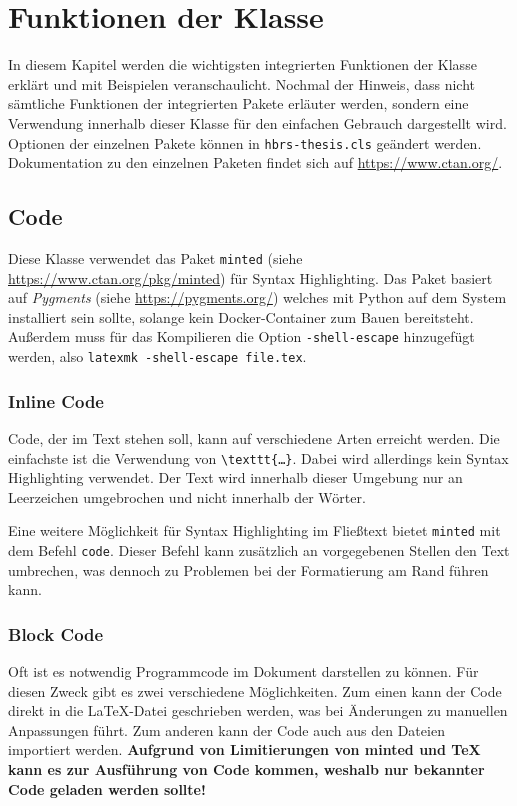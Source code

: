 \chapter{Funktionen der Klasse}
In diesem Kapitel werden die wichtigsten integrierten Funktionen der Klasse erklärt und mit Beispielen veranschaulicht. Nochmal der Hinweis, dass nicht sämtliche Funktionen der integrierten Pakete erläuter werden, sondern eine Verwendung innerhalb dieser Klasse für den einfachen Gebrauch dargestellt wird. Optionen der einzelnen Pakete können in \texttt{hbrs-thesis.cls} geändert werden. Dokumentation zu den einzelnen Paketen findet sich auf \url{https://www.ctan.org/}.

\section{Code}
Diese Klasse verwendet das Paket \texttt{minted} (siehe \url{https://www.ctan.org/pkg/minted}) für Syntax Highlighting. Das Paket basiert auf \textit{Pygments} (siehe \url{https://pygments.org/}) welches mit Python auf dem System installiert sein sollte, solange kein Docker-Container zum Bauen bereitsteht. Außerdem muss für das Kompilieren die Option \texttt{-shell-escape} hinzugefügt werden, also \texttt{latexmk -shell-escape file.tex}.

\subsection{Inline Code}
Code, der im Text stehen soll, kann auf verschiedene Arten erreicht werden. Die einfachste ist die Verwendung von \texttt{\textbackslash{}texttt\{…\}}. Dabei wird allerdings kein Syntax Highlighting verwendet. Der Text wird innerhalb dieser Umgebung nur an Leerzeichen umgebrochen und nicht innerhalb der Wörter.

Eine weitere Möglichkeit für Syntax Highlighting im Fließtext bietet \texttt{minted} mit dem Befehl \texttt{\texttt{code}}. Dieser Befehl kann zusätzlich an vorgegebenen Stellen den Text umbrechen, was dennoch zu Problemen bei der Formatierung am Rand führen kann.

\subsection{Block Code}
Oft ist es notwendig Programmcode im Dokument darstellen zu können. Für diesen Zweck gibt es zwei verschiedene Möglichkeiten. Zum einen kann der Code direkt in die \LaTeX-Datei geschrieben werden, was bei Änderungen zu manuellen Anpassungen führt. Zum anderen kann der Code auch aus den Dateien importiert werden. \textbf{Aufgrund von Limitierungen von minted und TeX kann es zur Ausführung von Code kommen, weshalb nur bekannter Code geladen werden sollte!}


